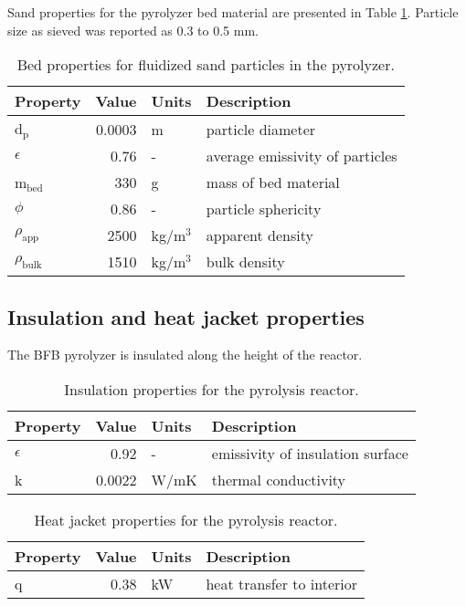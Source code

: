 Sand properties for the pyrolyzer bed material are presented in Table \ref{tab:sand-properties}. Particle size as sieved was reported as 0.3 to 0.5 mm.

\begin{table}[H]
    \centering
    \caption{Bed properties for fluidized sand particles in the pyrolyzer.}
    \label{tab:sand-properties}
    \begin{tabular}{lrll}
        \toprule
        Property & Value & Units & Description \\
        \midrule
        d$_\textrm{p}$ & 0.0003 & m & particle diameter \\
        $\epsilon$ & 0.76 & - & average emissivity of particles \\
        m$_\textrm{bed}$ & 330 & g & mass of bed material \\
        $\phi$ & 0.86 & - & particle sphericity \\
        $\rho_\textrm{app}$ & 2500 & kg/m$^3$ & apparent density \\
        $\rho_\textrm{bulk}$ & 1510 & kg/m$^3$ & bulk density \\
        \bottomrule
    \end{tabular}
\end{table}

\subsection{Insulation and heat jacket properties}

The BFB pyrolyzer is insulated along the height of the reactor.

\begin{table}[H]
    \centering
    \caption{Insulation properties for the pyrolysis reactor.}
    \label{tab:insulation}
    \begin{tabular}{lrll}
        \toprule
        Property & Value & Units & Description \\
        \midrule
        $\epsilon$ & 0.92 & - & emissivity of insulation surface \\
        k & 0.0022 & W/mK & thermal conductivity \\
        \bottomrule
    \end{tabular}
\end{table}

\begin{table}[H]
    \centering
    \caption{Heat jacket properties for the pyrolysis reactor.}
    \label{tab:heatjacket}
    \begin{tabular}{lrll}
        \toprule
        Property & Value & Units & Description \\
        \midrule
        q & 0.38 & kW & heat transfer to interior \\
        \bottomrule
    \end{tabular}
\end{table}

